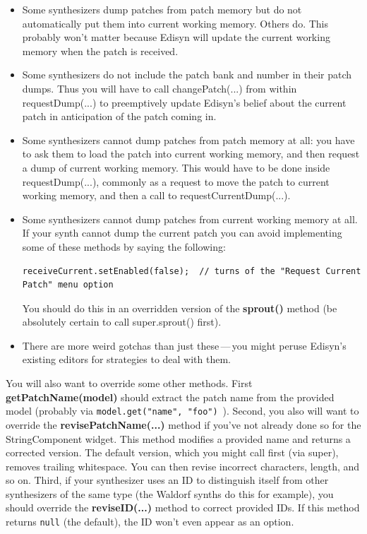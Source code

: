 \documentclass{article}
\begin{document}
\begin{itemize}
\item Some synthesizers dump patches from patch memory but do not automatically put them into current working memory.  Others do.  This probably won't matter because Edisyn will update the current working memory when the patch is received. 
\item Some synthesizers do not include the patch bank and number in their patch dumps.  Thus you will have to call changePatch(...) from within requestDump(...) to preemptively update Edisyn's belief about the current patch in anticipation of the patch coming in.
\item Some synthesizers cannot dump patches from patch memory at all: you have to ask them to load the patch into current working memory, and then request a dump of current working memory.  This would have to be done inside requestDump(...), commonly as a request to move the patch to current working memory, and then a call to requestCurrentDump(...).
\item Some synthesizers cannot dump patches from current working memory at all.  If your synth cannot dump the current patch you can avoid implementing some of these methods by saying the following:

\begin{verbatim}
receiveCurrent.setEnabled(false);  // turns of the "Request Current Patch" menu option
\end{verbatim}

You should do this in an overridden version of the  {\bf sprout()} method (be absolutely certain to call \mbox{super.sprout()} first).
\item There are more weird gotchas than just these\,---\,you might peruse Edisyn's existing editors for strategies to deal with them.
\end{itemize}

You will also want to override some other methods.  First {\bf getPatchName(model)} should extract the patch name from the provided model (probably via {\tt model.get("name", "foo")}\ ).  Second, you also will want to override the {\bf revisePatchName(...)} method if you've not already done so for the StringComponent widget.  This method modifies a provided name and returns a corrected version.  The default version, which you might call first (via super), removes trailing whitespace.  You can then revise incorrect characters, length, and so on.  Third, if your synthesizer uses an ID to distinguish itself from other synthesizers of the same type (the Waldorf synths do this for example), you should override the {\bf reviseID(...)} method to correct provided IDs.  If this method returns {\tt null} (the default), the  ID won't even appear as an option.
\end{document}
